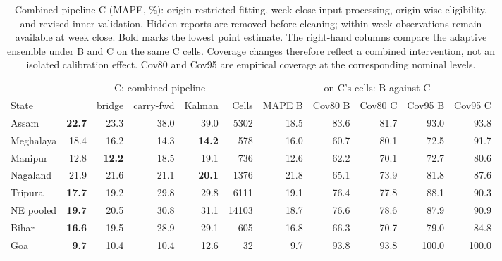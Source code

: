 \begin{table}[tbp]
\caption{Combined pipeline C (MAPE, \%): origin-restricted fitting, week-close input processing, origin-wise eligibility, and revised inner validation. Hidden reports are removed before cleaning; within-week observations remain available at week close. Bold marks the lowest point estimate. The right-hand columns compare the adaptive ensemble under B and C on the same C cells. Coverage changes therefore reflect a combined intervention, not an isolated calibration effect. Cov80 and Cov95 are empirical coverage at the corresponding nominal levels.}
\label{tab:causal}
\small
\setlength{\tabcolsep}{5pt}
\begin{tabular}{l rrrr r r rr rr}
\toprule
 & \multicolumn{5}{c}{C: combined pipeline} & \multicolumn{5}{c}{\auto{} on C's cells: B against C} \\
\cmidrule(lr){2-6}\cmidrule(lr){7-11}
State & \auto{} & bridge & carry-fwd & Kalman & Cells & MAPE B & Cov80 B & Cov80 C & Cov95 B & Cov95 C \\
\midrule
Assam & \textbf{22.7} & 23.3 & 38.0 & 39.0 & 5302 & 18.5 & 83.6 & 81.7 & 93.0 & 93.8 \\
Meghalaya & 18.4 & 16.2 & 14.3 & \textbf{14.2} & 578 & 16.0 & 60.7 & 80.1 & 72.5 & 91.7 \\
Manipur & 12.8 & \textbf{12.2} & 18.5 & 19.1 & 736 & 12.6 & 62.2 & 70.1 & 72.7 & 80.6 \\
Nagaland & 21.9 & 21.6 & 21.1 & \textbf{20.1} & 1376 & 21.8 & 65.1 & 73.9 & 81.8 & 87.6 \\
Tripura & \textbf{17.7} & 19.2 & 29.8 & 29.8 & 6111 & 19.1 & 76.4 & 77.8 & 88.1 & 90.3 \\
NE pooled & \textbf{19.7} & 20.5 & 30.8 & 31.1 & 14103 & 18.7 & 76.6 & 78.6 & 87.9 & 90.9 \\
\midrule
Bihar & \textbf{16.6} & 19.5 & 28.9 & 29.1 & 605 & 16.8 & 66.3 & 70.7 & 79.0 & 84.8 \\
Goa & \textbf{9.7} & 10.4 & 10.4 & 12.6 & 32 & 9.7 & 93.8 & 93.8 & 100.0 & 100.0 \\
\bottomrule
\end{tabular}
\end{table}
